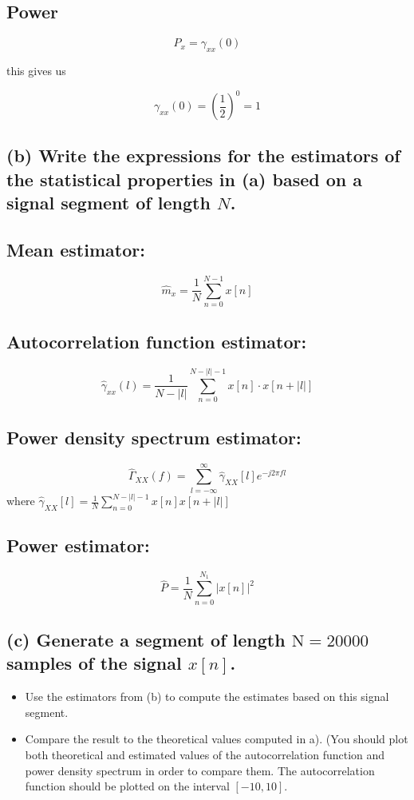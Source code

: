 \subsection*{Power}
$$P_x=\gamma_{xx}(0)$$

this gives us 

$$\gamma_{x x}(0)=\left(\frac{1}{2}\right)^0=1$$


\subsection*{(b) Write the expressions for the estimators of the statistical properties in (a) based on a signal segment of length $N$.}

\subsection*{Mean estimator:}

$$\hat{m}_x=\frac{1}{N}\sum_{n=0}^{N-1}x[n]$$

\subsection*{Autocorrelation function estimator:}

$$\hat{\gamma}_{x x}(l)=\frac{1}{N-|l|} \sum_{n=0}^{N-|l|-1} x[n] \cdot x[n+|l|]$$
\subsection*{Power density spectrum estimator:}

$$
\hat{\Gamma}_{X X}(f)=\sum_{l=-\infty}^{\infty} \hat{\gamma}_{X X}[l] e^{-j 2 \pi f l}
$$
where $\hat{\gamma}_{X X}[l]=\frac{1}{N} \sum_{n=0}^{N-|l|-1} x[n] x[n+|l|]$

\subsection*{Power estimator:}
$$\hat{P}=\frac{1}{N}\sum_{n=0}^{N_1}|x[n]|^2$$

\subsection*{(c) Generate a segment of length $\mathrm{N}=20000$ samples of the signal $x[n]$.}
\begin{itemize}
    \item Use the estimators from (b) to compute the estimates based on this signal segment.
    \item Compare the result to the theoretical values computed in a). (You should plot both theoretical and estimated values of the autocorrelation function and power density spectrum in order to compare them. The autocorrelation function should be plotted on the interval $[-10,10]$.
\end{itemize}

